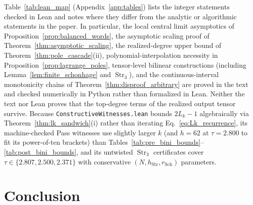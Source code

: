 \documentclass[11pt,a4paper]{article}
\theoremstyle{plain}
\theoremstyle{definition}
\theoremstyle{remark}
\DeclareMathOperator{\Str}{Str}
\begin{document}
Table~\ref{tab:lean_map} (Appendix~\ref{app:tables}) lists the integer statements checked in Lean and notes where they differ from the analytic or algorithmic statements in the paper. In particular, the local central limit asymptotics of Proposition~\ref{prop:balanced_words}, the asymptotic scaling proof of Theorem~\ref{thm:asymptotic_scaling}, the realized-degree upper bound of Theorem~\ref{thm:pole_cascade}(ii), polynomial-interpolation necessity in Proposition~\ref{prop:lagrange_poles}, tensor-level bilinear constructions (including Lemma~\ref{lem:finite_schonhage} and $\Str_3$), and the continuous-interval monotonicity chains of Theorem~\ref{thm:disproof_arbitrary} are proved in the text and checked numerically in Python rather than formalized in Lean. Neither the text nor Lean proves that the top-degree terms of the realized output tensor survive. Because \texttt{ConstructiveWitnesses.lean} bounds $2 L_k - 1$ algebraically via Theorem~\ref{thm:lk_sandwich}(i) rather than iterating Eq.~\eqref{eq:Lk_recurrence}, its machine-checked Pass witnesses use slightly larger $k$ (and $h = 62$ at $\tau = 2.800$ to fit its power-of-ten brackets) than Tables~\ref{tab:pre_bini_bounds}--\ref{tab:post_bini_bounds}, and its untwisted $\Str_3$ certificates cover $\tau \in \{2.807, 2.500, 2.371\}$ with conservative $(N, h_{\mathrm{Str}}, r_{\mathrm{Sch}})$ parameters.

\section{Conclusion}
\label{sec:conclusion}
\end{document}
